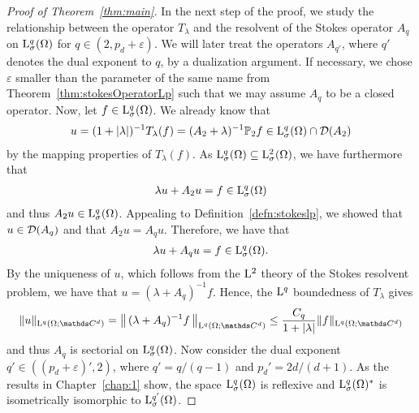 \begin{proof}[Proof of Theorem~\ref{thm:main}]
  In the next step of the proof, we study the relationship between the operator $T_\lambda$ and the resolvent of the Stokes operator $A_q$ on $\mathrm{L}^q_\sigma(\Omega)$ for $q \in (2, p_d + \varepsilon)$.
  We will later treat the operators $A_{q'}$, where $q'$ denotes the dual exponent to $q$, by a dualization argument.
  If necessary, we chose $\varepsilon$ smaller than the parameter of the same name from Theorem~\ref{thm:stokesOperatorLp} such that we may assume $A_q$ to be a closed operator.
  Now, let $f \in \mathrm{L}^q_\sigma(\Omega)$.
  We already know that 
  \begin{align*}
    u = (1 + |\lambda|)^{-1} T_\lambda(f) = (A_2 + \lambda)^{-1} \mathbb{P}_2 f \in \mathrm{L}^q_\sigma(\Omega) \cap \mathcal{D}(A_2)
  \end{align*}
  by the mapping properties of $T_\lambda(f)$.
  As $\mathrm{L}^q_\sigma(\Omega) \subseteq \mathrm{L}^2_\sigma(\Omega)$, we have furthermore that
  \begin{align*}
    \lambda u + A_2 u = f \in \mathrm{L}^q_\sigma(\Omega)
  \end{align*}
  and thus $A_2 u \in \mathrm{L}^q_\sigma(\Omega)$.
  Appealing to Definition~\ref{defn:stokeslp}, we showed that $u \in \mathcal{D}(A_q)$ and that $A_2u = A_q u$. 
  Therefore, we have that
  \begin{align*}
    \lambda u + A_q u = f \in \mathrm{L}^q_\sigma(\Omega).
  \end{align*}
  By the uniqueness of $u$, which follows from the $\mathrm{L}^2$ theory of the Stokes resolvent problem, we have that $u = (\lambda + A_q)^{-1} f$.
  Hence, the $\mathrm{L}^q$ boundedness of $T_\lambda$ gives
  \begin{align*}
    \|u\|_{\Ell^q(\Omega; \C^d)} 
    = \big\|\,(\lambda + A_q)^{-1}f \,\big\|_{\Ell^q(\Omega; \C^d)}
    \leq \frac{C_q}{ 1 + |\lambda|} \|f\|_{\Ell^q(\Omega; \C^d)}
  \end{align*}
  and thus $A_q$ is sectorial on $\mathrm{L}^q_\sigma(\Omega)$.
  Now consider the dual exponent $q' \in ((p_d + \varepsilon)', 2)$, where $q' = q / (q - 1)$ and $p_d' = 2d / (d + 1)$.
  As the results in Chapter~\ref{chap:1} show, the space $\mathrm{L}^q_\sigma(\Omega)$ is reflexive and $\mathrm{L}^q_\sigma(\Omega)^*$ is isometrically isomorphic to $\mathrm{L}^{q'}_\sigma(\Omega)$.%

\end{proof}
